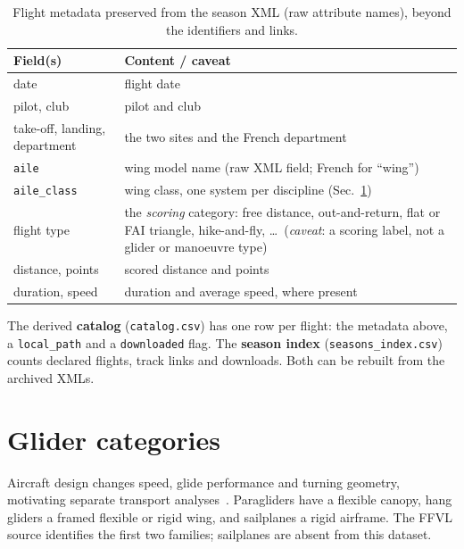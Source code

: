 \begin{table}[htbp]
\centering\small
\renewcommand{\arraystretch}{1.15}
\caption{Flight metadata preserved from the season XML (raw attribute names), beyond
the identifiers and links.}
\label{tab:catalogfields}
\begin{tabular}{|l|p{8.2cm}|}
\hline
\textbf{Field(s)} & \textbf{Content / caveat} \\
\hline
date & flight date \\
\hline
pilot, club & pilot and club \\
\hline
take-off, landing, department & the two sites and the French department \\
\hline
\texttt{aile} & wing model name (raw XML field; French for \enquote{wing}) \\
\hline
\texttt{aile\_class} & wing class, one system per discipline
  (Sec.~\ref{sec:glider}) \\
\hline
flight type & the \emph{scoring} category: free distance, out-and-return, flat or FAI
  triangle, hike-and-fly, \dots\ (\emph{caveat}: a scoring label, not a glider or
  manoeuvre type) \\
\hline
distance, points & scored distance and points \\
\hline
duration, speed & duration and average speed, where present \\
\hline
\end{tabular}
\end{table}

The derived \textbf{catalog} (\texttt{catalog.csv}) has one row per flight:
the metadata above, a \texttt{local\_path} and a \texttt{downloaded} flag.
The \textbf{season index} (\texttt{seasons\_index.csv}) counts declared flights,
track links and downloads. Both can be rebuilt from the archived XMLs.

\section{Glider categories}
\label{sec:glider}

\begin{revblock}
Aircraft design changes speed, glide performance and turning geometry,
motivating separate transport analyses~\cite{vilpellet2026}. Paragliders have
a flexible canopy, hang gliders a framed flexible or rigid wing, and sailplanes
a rigid airframe. The FFVL source identifies the first two families; sailplanes
are absent from this dataset.
\end{revblock}

